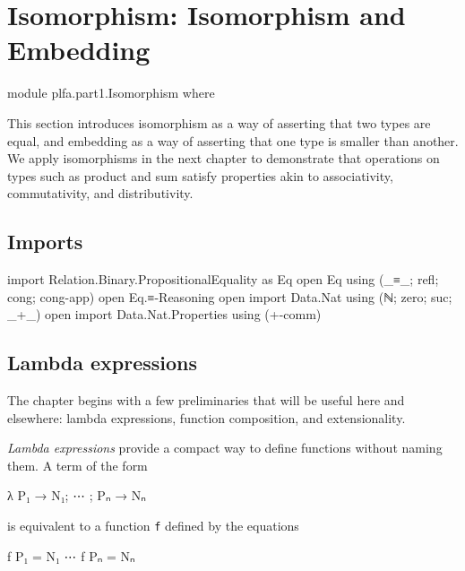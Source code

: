 \hypertarget{Isomorphism}{%
\chapter{Isomorphism: Isomorphism and Embedding}\label{Isomorphism}}

\begin{fence}
\begin{code}
module plfa.part1.Isomorphism where
\end{code}
\end{fence}

This section introduces isomorphism as a way of asserting that two types
are equal, and embedding as a way of asserting that one type is smaller
than another. We apply isomorphisms in the next chapter to demonstrate
that operations on types such as product and sum satisfy properties akin
to associativity, commutativity, and distributivity.

\hypertarget{imports}{%
\section{Imports}\label{imports}}

\begin{fence}
\begin{code}
import Relation.Binary.PropositionalEquality as Eq
open Eq using (_≡_; refl; cong; cong-app)
open Eq.≡-Reasoning
open import Data.Nat using (ℕ; zero; suc; _+_)
open import Data.Nat.Properties using (+-comm)
\end{code}
\end{fence}

\hypertarget{lambda-expressions}{%
\section{Lambda expressions}\label{lambda-expressions}}

The chapter begins with a few preliminaries that will be useful here and
elsewhere: lambda expressions, function composition, and extensionality.

\emph{Lambda expressions} provide a compact way to define functions
without naming them. A term of the form

\begin{myDisplay}
λ{ P₁ → N₁; ⋯ ; Pₙ → Nₙ }
\end{myDisplay}

is equivalent to a function \texttt{f} defined by the equations

\begin{myDisplay}
f P₁ = N₁
⋯
f Pₙ = Nₙ
\end{myDisplay}

